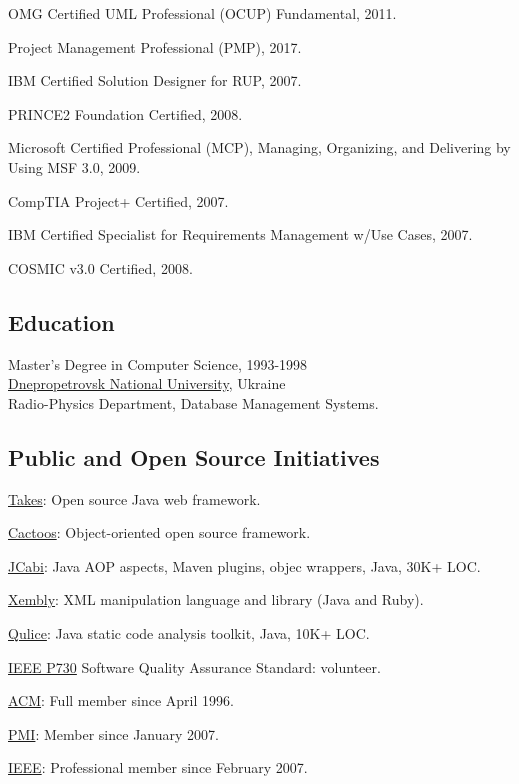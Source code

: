 \documentclass[12pt]{article}
\begin{document}
OMG Certified UML Professional (OCUP) Fundamental, 2011.

Project Management Professional (PMP), 2017.

IBM Certified Solution Designer for RUP, 2007.

PRINCE2 Foundation Certified, 2008.

Microsoft Certified Professional (MCP), Managing, Organizing, and Delivering by Using MSF 3.0, 2009.

CompTIA Project+ Certified, 2007.

IBM Certified Specialist for Requirements Management w/Use Cases, 2007.

COSMIC v3.0 Certified, 2008.

\subsection*{Education}

Master's Degree in Computer Science, 1993-1998\\
\href{http://dnu.dp.ua/}{Dnepropetrovsk National University}, Ukraine\\
Radio-Physics Department, Database Management Systems.

\subsection*{Public and Open Source Initiatives}

\href{http://www.takes.org}{Takes}: Open source Java web framework.

\href{http://www.cactoos.org}{Cactoos}: Object-oriented open source framework.

\href{http://www.jcabi.com}{JCabi}: Java AOP aspects, Maven plugins, objec wrappers, Java, 30K+ LOC.

\href{http://www.xembly.org}{Xembly}: XML manipulation language and library (Java and Ruby).

\href{http://www.qulice.com}{Qulice}: Java static code analysis toolkit, Java, 10K+ LOC.

\href{http://ieeexplore.ieee.org/document/6835311/}{IEEE P730} Software Quality Assurance Standard: volunteer.

\href{https://www.acm.org}{ACM}: Full member since April 1996.

\href{https://certification.pmi.org/registry.aspx}{PMI}: Member since January 2007.

\href{https://www.ieee.org}{IEEE}: Professional member since February 2007.
\end{document}

